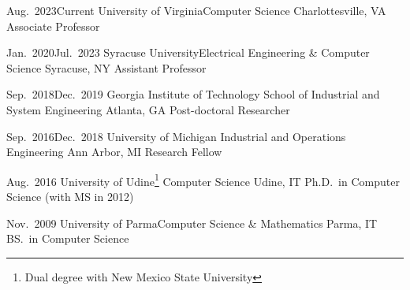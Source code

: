 \begin{experiences}
  \job
    {Aug.~2023}{Current}
    {University of Virginia}{Computer Science}
    {Charlottesville, VA}
    {Associate Professor}
    \emptySeparator

  \job
    {Jan.~2020}{Jul.~2023}
    {Syracuse University}{Electrical Engineering \& Computer Science}
    {Syracuse, NY}
    {Assistant Professor}
    \emptySeparator

    \job
    {Sep.~2018}{Dec.~2019}
    {Georgia Institute of Technology}
    {School of Industrial and System Engineering}
    {Atlanta, GA}
    {Post-doctoral Researcher}
    \emptySeparator

   \job
    {Sep.~2016}{Dec.~2018}
    {University of Michigan}
    {Industrial and Operations Engineering}
    {Ann Arbor, MI}
    {Research Fellow}    
\end{experiences}


\begin{experiences}

  \job
    {}{Aug.~2016}
    {University of Udine\footnote{Dual degree with New Mexico State University}}
    {Computer Science}
    {Udine, IT}
    {Ph.D.~in Computer Science (with MS in 2012)}
    \emptySeparator




  \job
    {}{Nov.~2009}
    {University of Parma}{Computer Science \& Mathematics}
    {Parma, IT}
    {BS.~in Computer Science}
\end{experiences}
